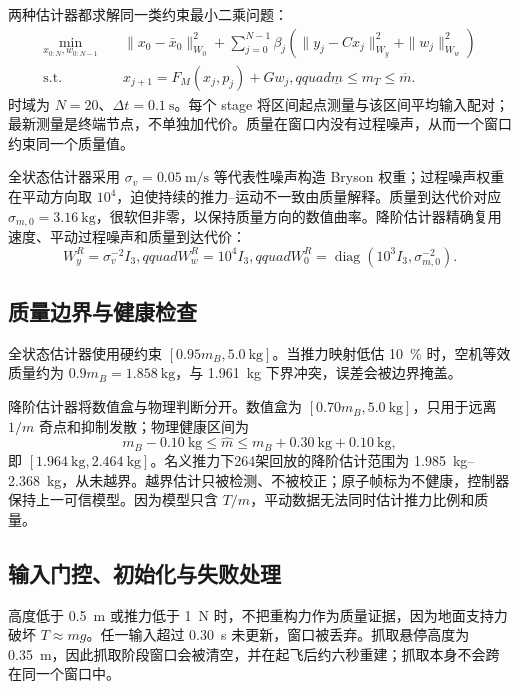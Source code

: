 \documentclass[11pt,UTF8,fontset=none]{ctexrep}
\providecommand{\mB}{m_B}
\providecommand{\mT}{m_T}
\begin{document}
两种估计器都求解同一类约束最小二乘问题：
\begin{align}
\min_{x_{0:N},w_{0:N-1}}\quad &
\|x_0-\bar x_0\|_{W_0}^2+
\sum_{j=0}^{N-1}\beta_j\left(\|y_j-Cx_j\|_{W_y}^2+\|w_j\|_{W_w}^2\right)\\
\text{s.t.}\quad &x_{j+1}=F_M(x_j,p_j)+Gw_j,qquad
\underline m\le\mT\le\overline m.
\end{align}
时域为 $N=20$、$\Delta t=\SI{0.1}{\second}$。每个 stage 将区间起点测量与该区间平均输入配对；最新测量是终端节点，不单独加代价。质量在窗口内没有过程噪声，从而一个窗口约束同一个质量值。

全状态估计器采用 $\sigma_v=\SI{0.05}{\meter\per\second}$ 等代表性噪声构造 Bryson 权重；过程噪声权重在平动方向取 $10^4$，迫使持续的推力--运动不一致由质量解释。质量到达代价对应 $\sigma_{m,0}=\SI{3.16}{\kg}$，很软但非零，以保持质量方向的数值曲率。降阶估计器精确复用速度、平动过程噪声和质量到达代价：
\begin{equation}
W_y^R=\sigma_v^{-2}I_3,qquad W_w^R=10^4I_3,qquad
W_0^R=\operatorname{diag}(10^3I_3,\sigma_{m,0}^{-2}).
\end{equation}

\subsection{质量边界与健康检查}

全状态估计器使用硬约束 $[0.95\mB,\SI{5.0}{\kg}]$。当推力映射低估 \SI{10}{\percent} 时，空机等效质量约为 $0.9\mB=\SI{1.858}{\kg}$，与 \SI{1.961}{\kg} 下界冲突，误差会被边界掩盖。

降阶估计器将数值盒与物理判断分开。数值盒为 $[0.70\mB,\SI{5.0}{\kg}]$，只用于远离 $1/m$ 奇点和抑制发散；物理健康区间为
\begin{equation}
\mB-\SI{0.10}{\kg}\le \hat m\le
\mB+\SI{0.30}{\kg}+\SI{0.10}{\kg},
\end{equation}
即 $[\SI{1.964}{\kg},\SI{2.464}{\kg}]$。名义推力下264架回放的降阶估计范围为 \SIrange{1.985}{2.368}{\kg}，从未越界。越界估计只被检测、不被校正；原子帧标为不健康，控制器保持上一可信模型。因为模型只含 $T/m$，平动数据无法同时估计推力比例和质量。

\subsection{输入门控、初始化与失败处理}

高度低于 \SI{0.5}{\meter} 或推力低于 \SI{1}{\newton} 时，不把重构力作为质量证据，因为地面支持力破坏 $T\approx mg$。任一输入超过 \SI{0.30}{\second} 未更新，窗口被丢弃。抓取悬停高度为 \SI{0.35}{\meter}，因此抓取阶段窗口会被清空，并在起飞后约六秒重建；抓取本身不会跨在同一个窗口中。
\end{document}
